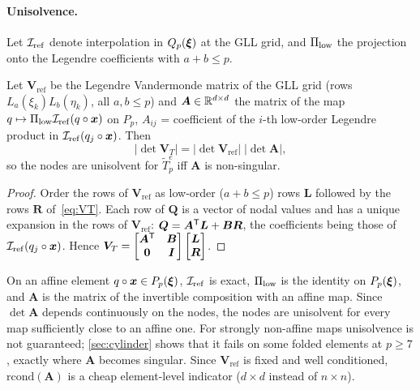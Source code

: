\paragraph{Unisolvence.} Let $\mathcal{I}_{\mathrm{ref}}$ denote interpolation in $Q_p(\bm{\xi})$ at the GLL grid, and
$\Pi_{\mathrm{low}}$ the projection onto the Legendre coefficients with $a+b\le p$.
\begin{proposition}[factorisation]\label{prop:factor}
Let $\bm V_{\mathrm{ref}}$ be the Legendre Vandermonde matrix of the GLL grid (rows
$L_a(\xi_k)L_b(\eta_k)$, all $a,b\le p$) and $\bm A\in\mathbb{R}^{d\times d}$ the matrix of the map
$q\mapsto\Pi_{\mathrm{low}}\mathcal{I}_{\mathrm{ref}}(q\circ\bm{x})$ on $P_p$, $A_{ij}$ = coefficient of the $i$-th low-order Legendre
product in $\mathcal{I}_{\mathrm{ref}}(q_j\circ\bm{x})$. Then
\begin{equation}
  |\det\bm V_T|=|\det\bm V_{\mathrm{ref}}|\;|\det\bm A| ,
  \label{eq:factor}
\end{equation}
so the nodes are unisolvent for $\tilde T_p^e$ iff $\bm A$ is non-singular.
\end{proposition}
\begin{proof}
Order the rows of $\bm V_{\mathrm{ref}}$ as low-order ($a+b\le p$) rows $\bm L$ followed by the
rows $\bm R$ of~\eqref{eq:VT}. Each row of $\bm Q$ is a vector of nodal values and has a unique
expansion in the rows of $\bm V_{\mathrm{ref}}$: $\bm Q=\bm A^{\mathsf{T}}\bm L+\bm B\bm R$, the
coefficients being those of $\mathcal{I}_{\mathrm{ref}}(q_j\circ\bm{x})$. Hence
$\bm V_T=\begin{bmatrix}\bm A^{\mathsf{T}}&\bm B\\ \bm0&\bm I\end{bmatrix}\begin{bmatrix}\bm L\\ \bm R
\end{bmatrix}$.
\end{proof}
On an affine element $q\circ\bm{x}\in P_p(\bm{\xi})$, $\mathcal{I}_{\mathrm{ref}}$ is exact, $\Pi_{\mathrm{low}}$ is the identity on
$P_p(\bm{\xi})$, and $\bm A$ is the matrix of the invertible composition with an affine map. Since
$\det\bm A$ depends continuously on the nodes, the nodes are unisolvent for every map
sufficiently close to an affine one. For strongly non-affine maps unisolvence is not
guaranteed; \cref{sec:cylinder} shows that it fails on some folded elements at $p\ge7$, exactly
where $\bm A$ becomes singular. Since $\bm V_{\mathrm{ref}}$ is fixed and well conditioned,
$\mathrm{rcond}(\bm A)$ is a cheap element-level indicator ($d\times d$ instead of $n\times n$).

